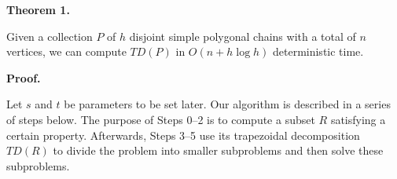 \par
\par
\par\medskip\noindent\textbf{Theorem 1.}\par
Given a collection $P$ of $h$ disjoint simple polygonal chains with a total of $n$ vertices, we can compute $\textit{TD}(P)$ in $O(n+h\log h)$ deterministic time.
\par
\par
\par
\par\medskip\noindent\textbf{Proof.}\par
Let $s$ and $t$ be parameters to be set later. Our algorithm is described in a series of steps below. The purpose of Steps 0–2 is to compute a subset $R$ satisfying a certain property. Afterwards, Steps 3–5 use its trapezoidal decomposition $\textit{TD}(R)$ to divide the problem into smaller subproblems and then solve these subproblems.
\par
\par
